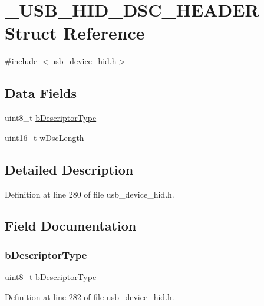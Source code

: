 \hypertarget{struct___u_s_b___h_i_d___d_s_c___h_e_a_d_e_r}{}\section{\+\_\+\+U\+S\+B\+\_\+\+H\+I\+D\+\_\+\+D\+S\+C\+\_\+\+H\+E\+A\+D\+ER Struct Reference}
\label{struct___u_s_b___h_i_d___d_s_c___h_e_a_d_e_r}


{\ttfamily \#include $<$usb\+\_\+device\+\_\+hid.\+h$>$}

\subsection*{Data Fields}
\begin{DoxyCompactItemize}
\item 
uint8\+\_\+t \mbox{\hyperlink{struct___u_s_b___h_i_d___d_s_c___h_e_a_d_e_r_a67d7027b9eb9ed268d28e84fbc675707}{b\+Descriptor\+Type}}
\item 
uint16\+\_\+t \mbox{\hyperlink{struct___u_s_b___h_i_d___d_s_c___h_e_a_d_e_r_aba365ad44f648f09cd46a68dec863532}{w\+Dsc\+Length}}
\end{DoxyCompactItemize}


\subsection{Detailed Description}


Definition at line 280 of file usb\+\_\+device\+\_\+hid.\+h.



\subsection{Field Documentation}
\mbox{\label{struct___u_s_b___h_i_d___d_s_c___h_e_a_d_e_r_a67d7027b9eb9ed268d28e84fbc675707}} 
\subsubsection{\texorpdfstring{bDescriptorType}{bDescriptorType}}
{\footnotesize\ttfamily uint8\+\_\+t b\+Descriptor\+Type}



Definition at line 282 of file usb\+\_\+device\+\_\+hid.\+h.

